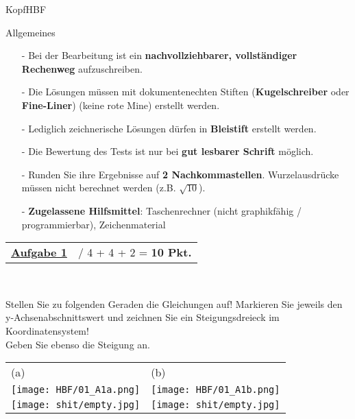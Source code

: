 \documentclass[oneside,openany,headings=optiontotoc,11pt,numbers=noenddot]{scrreprt}
\begin{document}
	\begin{test}{0.725}{KopfHBF}
		\begin{framed}
			\noindent
			\small{Allgemeines
			\begin{itemize}
				\item[-] Bei der Bearbeitung ist ein \textbf{nachvollziehbarer, vollständiger Rechenweg} aufzuschreiben.
				\item[-] Die Lösungen müssen mit dokumentenechten Stiften (\textbf{Kugelschreiber} oder \textbf{Fine-Liner}) (keine rote Mine) erstellt werden.
				\item[-] Lediglich zeichnerische Lösungen dürfen in \textbf{Bleistift} erstellt werden.
				\item[-] Die Bewertung des Tests ist nur bei \textbf{gut lesbarer Schrift} möglich.
				\item[-] Runden Sie ihre Ergebnisse auf \textbf{2 Nachkommastellen}. Wurzelausdrücke müssen nicht berechnet werden (z.B. \(\sqrt{10}\)).
				\item[-] \textbf{Zugelassene Hilfsmittel}: Taschenrechner (nicht graphikfähig / programmierbar), Zeichenmaterial
			\end{itemize}}
		\end{framed}
		\normalsize
		\begin{framed}
			\noindent
			\begin{tabularx}{\textwidth}{Xl}\underline{\textbf{Aufgabe 1}}& / 4 + 4 + 2 = \textbf{10 Pkt.}\end{tabularx}\\
			\par\noindent
			Stellen Sie zu folgenden Geraden die Gleichungen auf! Markieren Sie jeweils den y-Achsenabschnittswert und zeichnen Sie ein Steigungsdreieck im Koordinatensystem!\\
			Geben Sie ebenso die Steigung an.\\
			\par\noindent
			\begin{tabularx}{\textwidth}{XX}
				(a)  & (b)\\
				\texttt{[image: HBF/01\_A1a.png]} & \texttt{[image: HBF/01\_A1b.png]}\\
				\texttt{[image: shit/empty.jpg]} & \texttt{[image: shit/empty.jpg]}\\
			\end{tabularx}\\
			\par\noindent

\end{framed}
\end{test}
\end{document}
